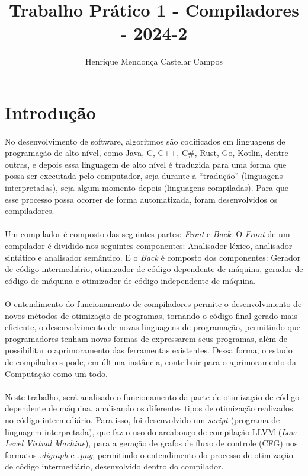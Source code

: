 \documentclass[12pt]{article}
\title{Trabalho Prático 1 - Compiladores - 2024-2}
\author{Henrique Mendonça Castelar Campos}
\begin{document}
\maketitle

\section{Introdução}

\paragraph{}No desenvolvimento de software, algoritmos são codificados em linguagens de programação de alto nível, como Java, C, C++, C\#, Rust, Go, Kotlin, dentre outras, e depois essa linguagem de alto nível é traduzida para uma forma que possa ser executada pelo computador, seja durante a “tradução” (linguagens interpretadas), seja algum momento depois (linguagens compiladas). Para que esse processo possa ocorrer de forma automatizada, foram desenvolvidos os compiladores.

\paragraph{}Um compilador é composto das seguintes partes: \textit{Front} e \textit{Back}. O \textit{Front} de um compilador é dividido nos seguintes componentes: Analisador léxico, analisador sintático e analisador semântico. E o \textit{Back} é composto dos componentes: Gerador de código intermediário, otimizador de código dependente de máquina, gerador de código de máquina e otimizador de código independente de máquina.

\paragraph{}O entendimento do funcionamento de compiladores permite o desenvolvimento de novos métodos de otimização de programas, tornando o código final gerado mais eficiente, o desenvolvimento de novas linguagens de programação, permitindo que programadores tenham novas formas de expressarem seus programas, além de possibilitar o aprimoramento das ferramentas existentes. Dessa forma, o estudo de compiladores pode, em última instância, contribuir para o aprimoramento da Computação como um todo.

\paragraph{}Neste trabalho, será analisado o funcionamento da parte de otimização de código dependente de máquina, analisando os diferentes tipos de otimização realizados no código intermediário. Para isso, foi desenvolvido um \textit{script} (programa de linguagem interpretada), que faz o uso do arcabouço de compilação LLVM (\textit{Low Level Virtual Machine}), para a geração de grafos de fluxo de controle (CFG) nos formatos \textit{.digraph} e \textit{.png}, permitindo o entendimento do processo de otimização de código intermediário, desenvolvido dentro do compilador.
\end{document}
